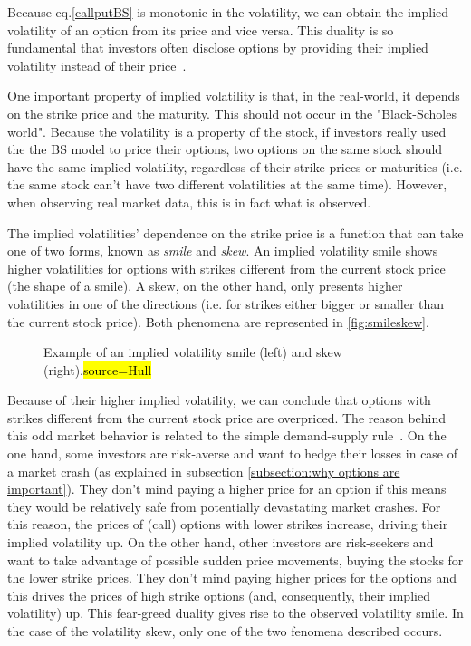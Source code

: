 Because eq.\eqref{callputBS} is monotonic in the volatility, we can obtain the implied volatility of an option from its price and vice versa. This duality is so fundamental that investors often disclose options by providing their implied volatility instead of their price~\cite{Wilmott}.

One important property of implied volatility is that, in the real-world, it depends on the strike price and the maturity. This should not occur in the "Black-Scholes world". Because the volatility is a property of the stock, if investors really used the the BS model to price their options, two options on the same stock should have the same implied volatility, regardless of their strike prices or maturities (i.e. the same stock can't have two different volatilities at the same time).
However, when observing real market data, this is in fact what is observed.

The implied volatilities' dependence on the strike price is a function that can take one of two forms, known as \emph{smile} and \emph{skew}.
An implied volatility smile shows higher volatilities for options with strikes different from the current stock price (the shape of a smile). A skew, on the other hand, only presents higher volatilities in one of the directions (i.e. for strikes either bigger or smaller than the current stock price). Both phenomena are represented in \autoref{fig:smileskew}.

\begin{figure}[!htb]
  \begin{subfigmatrix}{2}
  \end{subfigmatrix}
  \caption[Example of an implied volatility smile and skew.]{Example of an implied volatility smile (left) and skew (right).\hl{source=Hull}}
  \label{fig:smileskew}
\end{figure}


Because of their higher implied volatility, we can conclude that options with strikes different from the current stock price are overpriced.
The reason behind this odd market behavior is related to the simple demand-supply rule~\cite{Wilmott3}. On the one hand, some investors are risk-averse and want to hedge their losses in case of a market crash (as explained in subsection \ref{subsection:why options are important}). They don't mind paying a higher price for an option if this means they would be relatively safe from potentially devastating market crashes. For this reason, the prices of (call) options with lower strikes increase, driving their implied volatility up. On the other hand, other investors are risk-seekers and want to take advantage of possible sudden price movements, buying the stocks for the lower strike prices. They don't mind paying higher prices for the options and this drives the prices of high strike options (and, consequently, their implied volatility) up. This fear-greed duality gives rise to the observed volatility smile. In the case of the volatility skew, only one of the two fenomena described occurs.



